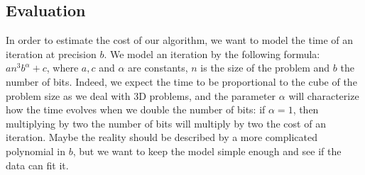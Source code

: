 \subsection{Evaluation}
   
   In order to estimate the cost of our algorithm, we want to model the time of an iteration at precision $b$. We model an iteration by the following formula: $an^3b^\alpha+c$, where $a,c$ and $\alpha$ are constants,
   $n$ is the size of the problem and $b$ the number of bits. Indeed, we expect the time to be proportional to the cube of the problem size as we deal with 3D problems, and the parameter $\alpha$ will characterize how the time evolves when we double the number of bits: if $\alpha = 1$, then multiplying by two the number of bits will multiply by two the cost of an iteration. Maybe the reality should be described by a more complicated polynomial in $b$, but we want to keep the model simple enough and see if the data can fit it.
   

